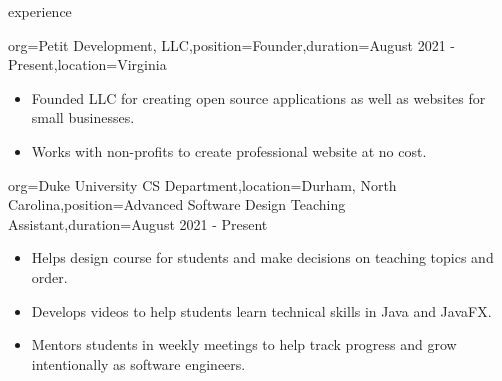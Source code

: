 \documentclass{resume}
\begin{document}
\begin{ResumeSection}{experience}
    \begin{ResumeSubsection}{org={Petit Development, LLC},position={Founder},duration={August 2021 - Present},location={Virginia}}
        \begin{itemize}
            \item Founded LLC for creating open source applications as well as
                websites for small businesses.
            \item Works with non-profits to create professional website at no cost.
        \end{itemize}
    \end{ResumeSubsection}

    \begin{ResumeSubsection}{org={Duke University CS Department},location={Durham, North Carolina},position={Advanced Software Design Teaching Assistant},duration={August 2021 - Present}}
        \begin{itemize}
            \item Helps design course for students and make decisions on teaching topics and order.
            \item Develops videos to help students learn technical skills in Java and JavaFX.
            \item Mentors students in weekly meetings to help track progress and grow intentionally as software engineers.
        \end{itemize}

    \end{ResumeSubsection}
\end{ResumeSection}
\end{document}
